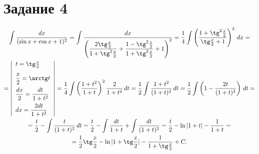 \section{Задание 4}
\begin{multline*}
    \int \frac{dx}{(\sin x + \cos x + 1)^2} =
        \int \frac{dx}{\left(\displaystyle\frac{2\tg\frac{x}{2}}{1+\tg^2\frac{x}{2}} + 
            \displaystyle\frac{1-\tg^2\frac{x}{2}}{1+\tg^2\frac{x}{2}} + 1\right)^2} =
        \frac{1}{4} \int \left( \frac{1+\tg^2 \frac{x}{2}}{\tg\frac{x}{2} +
    1}\right)^2 \, dx = \\ =
    \left| \begin{array}{l}
        t = \tg\frac{x}{2} \\[0.3cm]
        \displaystyle\frac{x}{2} = \arctg t \\[0.3cm]
        \displaystyle\frac{dx}{2} = \displaystyle\frac{dt}{1+t^2} \\[0.3cm]
        dx = \displaystyle\frac{2 dt}{1+t^2}
    \end{array} \right| = \frac{1}{4} \int \left(\frac{1+t^2}{1+t}\right)^2
        \frac{2}{1+t^2} \, dt = \frac{1}{2} \int \frac{1+t^2}{(1+t)^2} \, dt = 
        \frac{1}{2} \int \left(1 - \frac{2t}{(1+t)^2}\right) \, dt = \\ =
        \frac{t}{2} - \int \frac{t}{(1+t)^2}\, dt = 
        \frac{t}{2} - \int \frac{dt}{1+t} + \int \frac{dt}{(1+t)^2} = 
        \frac{t}{2} - \ln |1+t| - \frac{1}{1+t} = \\ =
        \frac{1}{2}\tg\frac{x}{2} - \ln |1+\tg\frac{x}{2}| -
            \frac{1}{1+\tg\frac{x}{2}} + C. 
\end{multline*}
